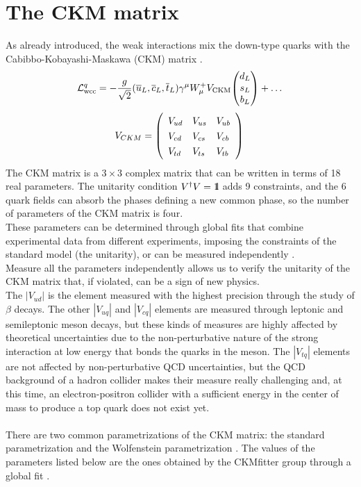 \section{The CKM matrix}\label{sec:CKM}
As already introduced, the weak interactions mix the down-type quarks with the Cabibbo-Kobayashi-Maskawa (CKM) matrix \cite{Cabibbo_angle,Kobayashi1973CP-ViolationInteraction}.
\begin{equation}
    \Lg{wcc}^q=-\frac{g}{\sqrt{2}}(\overline{{{u}}}_{L},\overline{{{c}}}_{L},\overline{{{t}}}_{L})\gamma^{\mu}W_{\mu}^{+}V_{\mathrm{CKM}}\tb{d_{L}}{s_{L}}{b_L}+\dots
\end{equation}
\begin{equation}
V_{C K M}=\left(\begin{array}{l l l}{{V_{u d}}}&{{V_{u s}}}&{{V_{u b}}}\\ {{V_{c d}}}&{{V_{c s}}}&{{V_{c b}}}\\ {{V_{t d}}}&{{V_{t s}}}&{{V_{t b}}}\end{array}\right)\,
\end{equation}
The CKM matrix is a $3 \times 3$ complex matrix that can be written in terms of 18 real parameters. The unitarity condition $V^\dagger V= 1\kern-0.25em\text{l}$ adds 9 constraints, and the 6 quark fields can absorb the phases defining a new common phase, so the number of parameters of the CKM matrix is four.\\
These parameters can be determined through global fits that combine experimental data from different experiments, imposing the constraints of the standard model (\eg the unitarity), or can be measured independently \cite{PDG_2022}.\\
Measure all the parameters independently allows us to verify the unitarity of the CKM matrix that, if violated, can be a sign of new physics.\\
The $|V_{ud}|$ is the element measured with the highest precision through  the study of $\beta$ decays. The other $|V_{uq}|$ and $|V_{cq}|$ elements are measured through leptonic and semileptonic meson decays, but these kinds of measures are highly affected by theoretical uncertainties due to the non-perturbative nature of the strong interaction at low energy that bonds the quarks in the meson.
The $|V_{tq}|$ elements are not affected by non-perturbative QCD uncertainties, but the QCD background of a hadron collider makes their measure really challenging and, at this time, an electron-positron collider with a sufficient energy in the center of mass to produce a top quark does not exist yet.
\\
\\
There are two common parametrizations of the CKM matrix: the standard parametrization and the Wolfenstein parametrization \cite{PDG_2022}.
The values of the parameters listed below are the ones obtained by the CKMfitter group through a global fit \cite{Charles2005CPFactories,Hocker2001AMatrix,PDG_2022}.
